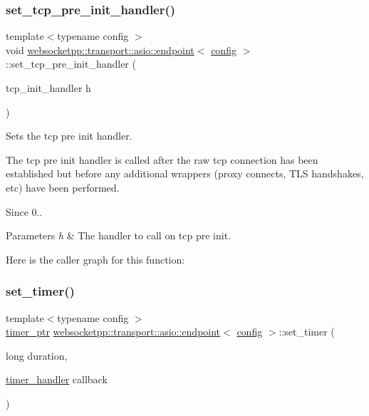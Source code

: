\subsubsection{\texorpdfstring{set\+\_\+tcp\+\_\+pre\+\_\+init\+\_\+handler()}{set\_tcp\_pre\_init\_handler()}}
{\footnotesize\ttfamily template$<$typename config $>$ \\
void \mbox{\hyperlink{classwebsocketpp_1_1transport_1_1asio_1_1endpoint}{websocketpp\+::transport\+::asio\+::endpoint}}$<$ \mbox{\hyperlink{classconfig}{config}} $>$\+::set\+\_\+tcp\+\_\+pre\+\_\+init\+\_\+handler (\begin{DoxyParamCaption}\item[{tcp\+\_\+init\+\_\+handler}]{h }\end{DoxyParamCaption})\hspace{0.3cm}{\ttfamily [inline]}}



Sets the tcp pre init handler. 

The tcp pre init handler is called after the raw tcp connection has been established but before any additional wrappers (proxy connects, T\+LS handshakes, etc) have been performed.

\begin{DoxySince}{Since}
0..
\end{DoxySince}

\begin{DoxyParams}{Parameters}
{\em h} & The handler to call on tcp pre init. \\
\hline
\end{DoxyParams}
Here is the caller graph for this function\+:
\mbox{\label{classwebsocketpp_1_1transport_1_1asio_1_1endpoint_a63525bd209bb3dabf373b9b72d37e78e}} 
\subsubsection{\texorpdfstring{set\+\_\+timer()}{set\_timer()}}
{\footnotesize\ttfamily template$<$typename config $>$ \\
\mbox{\hyperlink{classwebsocketpp_1_1transport_1_1asio_1_1endpoint_a1802f5762009dbed117ff793fa87468f}{timer\+\_\+ptr}} \mbox{\hyperlink{classwebsocketpp_1_1transport_1_1asio_1_1endpoint}{websocketpp\+::transport\+::asio\+::endpoint}}$<$ \mbox{\hyperlink{classconfig}{config}} $>$\+::set\+\_\+timer (\begin{DoxyParamCaption}\item[{long}]{duration,  }\item[{\mbox{\hyperlink{namespacewebsocketpp_1_1transport_a946cc56ff41139f3002149c15fd87bc9}{timer\+\_\+handler}}}]{callback }\end{DoxyParamCaption})\hspace{0.3cm}{\ttfamily [inline]}}



